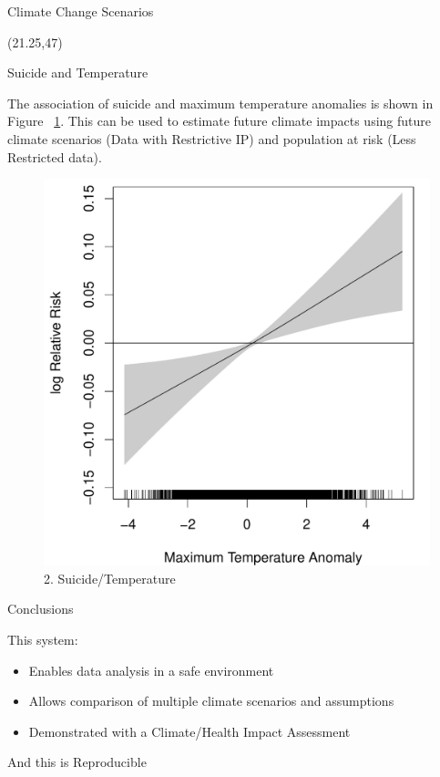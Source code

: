 \documentclass[final]{beamer}
\begin{document}
\begin{frame}{}
\begin{textblock}{17}
\begin{block}{Climate Change Scenarios}
\begin{tiny}
\end{tiny}
\end{block}
\end{textblock}
\begin{textblock}{17}(21.25,47)

\begin{block}{Suicide and Temperature}
\begin{tiny}
The association of suicide and maximum temperature anomalies is shown in Figure ~\ref{fig:suigam}.  This can be used to estimate future climate impacts using future climate scenarios {\color{red} (Data with Restrictive IP)}  and population at risk {\color{blue} (Less Restricted data)}.
\end{tiny}
\begin{figure}[!h]
\centering
\includegraphics[width=.6\textwidth]{tmaxanom2.pdf}
\caption{2. Suicide/Temperature}
\label{fig:suigam}
\end{figure}
\end{block}

\begin{block}{Conclusions}
\begin{scriptsize}
This system:
\begin{itemize}
\item Enables data analysis in a safe environment
\item Allows comparison of multiple climate scenarios and assumptions
\item Demonstrated with a Climate/Health Impact Assessment
\end{itemize}
\begin{itemize}
\begin{large}
\item And this is Reproducible
\end{large}
\end{itemize}
\end{scriptsize}
\end{block}
\end{textblock}


\end{frame}
\end{document}
